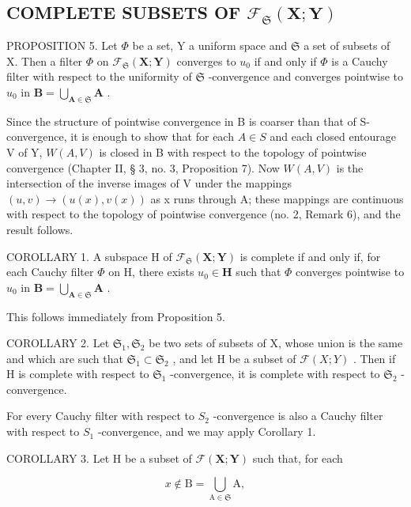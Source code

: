 \subsection{\texorpdfstring{COMPLETE SUBSETS OF \(\mathcal{F}_{\mathfrak{S}}(\mathbf{X};\mathbf{Y})\)}{COMPLETE SUBSETS OF F SUB S (X;Y)}}

PROPOSITION 5. Let \(\Phi\) be a set, Y a uniform space and \(\mathfrak{S}\) a set of subsets of X. Then a filter \(\Phi\) on \(\mathcal{F}_{\mathfrak{S}}(\mathbf{X};\mathbf{Y})\) converges to \(u_0\) if and only if \(\Phi\) is a Cauchy filter with respect to the uniformity of \(\mathfrak{S}\) -convergence and converges pointwise to \(u_0\) in \(\mathbf{B} = \bigcup_{\mathbf{A}\in \mathfrak{S}}\mathbf{A}\) .

Since the structure of pointwise convergence in B is coarser than that of S-convergence, it is enough to show that for each \(A \in S\) and each closed entourage V of Y, \(W(A, V)\) is closed in B with respect to the topology of pointwise convergence (Chapter II, § 3, no. 3, Proposition 7). Now \(W(A, V)\) is the intersection of the inverse images of V under the mappings \((u, v) \to (u(x), v(x))\) as x runs through A; these mappings are continuous with respect to the topology of pointwise convergence (no. 2, Remark 6), and the result follows.

COROLLARY 1. A subspace H of \(\mathcal{F}_{\mathfrak{S}}(\mathbf{X};\mathbf{Y})\) is complete if and only if, for each Cauchy filter \(\Phi\) on H, there exists \(u_0\in \mathbf{H}\) such that \(\Phi\) converges pointwise to \(u_0\) in \(\mathbf{B} = \bigcup_{\mathbf{A}\in \mathfrak{S}}\mathbf{A}\) .

This follows immediately from Proposition 5.

COROLLARY 2. Let \(\mathfrak{S}_1, \mathfrak{S}_2\) be two sets of subsets of X, whose union is the same and which are such that \(\mathfrak{S}_1 \subset \mathfrak{S}_2\) , and let H be a subset of \(\mathcal{F}(X; Y)\) . Then if H is complete with respect to \(\mathfrak{S}_1\) -convergence, it is complete with respect to \(\mathfrak{S}_2\) -convergence.

For every Cauchy filter with respect to \(S_{2}\) -convergence is also a Cauchy filter with respect to \(S_{1}\) -convergence, and we may apply Corollary 1.

COROLLARY 3. Let H be a subset of \(\mathcal{F}(\mathbf{X};\mathbf{Y})\) such that, for each

\[
x \notin \mathrm{B} = \bigcup_ {\mathrm{A} \in \mathfrak {S}} \mathrm{A},
\]

